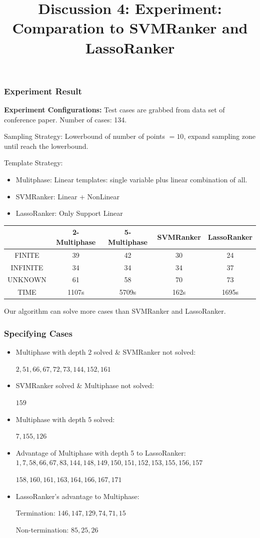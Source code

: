 \documentclass[10pt]{beamer}
\title{Discussion 4: Experiment: Comparation to SVMRanker and LassoRanker}
\begin{document}
\maketitle
\begin{frame}\frametitle{Experiment Result}
\textbf{Experiment Configurations:}
Test cases are grabbed from data set of conference paper. Number of cases: 134.

Sampling Strategy: Lowerbound of number of points $=10$, expand sampling zone until reach the lowerbound.

Template Strategy: 
\begin{itemize}
\item Mulitphase: Linear templates: single variable plus linear combination of all.
\item SVMRanker: Linear + NonLinear
\item LassoRanker: Only Support Linear
\end{itemize}
\begin{center}
\begin{tabular}{|c|c|c|c|c|}
\hline
& 2-Multiphase& 5-Multiphase & SVMRanker & LassoRanker\\
\hline 
FINITE & 39 & 42&30 & 24\\
\hline 

INFINITE & 34& 34&34 & 37\\
\hline

UNKNOWN & 61& 58&70 & 73\\
\hline
TIME &1107s& 5709s& 162s& 1695s\\
\hline

\end{tabular}
\end{center}


Our algorithm can solve more cases than SVMRanker and LassoRanker.
\end{frame}


\begin{frame}\frametitle{Specifying Cases}
\begin{itemize}
\item Multiphase with depth 2 solved \& SVMRanker not solved:

$2,51,66,67,72,73,144,152,161$
\item SVMRanker solved \& Multiphase not solved:

$159$
\item Multiphase with depth 5 solved:

$7,155,126$
\item Advantage of Multiphase with depth 5 to LassoRanker:
$1,7,58,66,67,83,144,148,149,150,151,152,153,155,156,157$

$158,160,161,163,164,166,167,171$

\item LassoRanker's advantage to Multiphase:

Termination: $146,147,129,74,71,15$

Non-termination: $85,25,26$
\end{itemize}

\end{frame}
\end{document}
